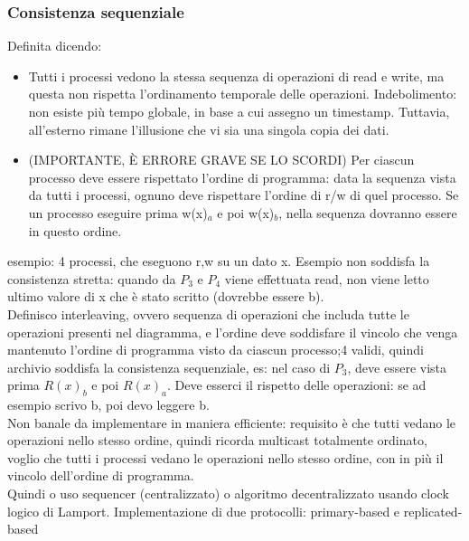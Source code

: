\documentclass{article}
\begin{document}
\subsubsection{Consistenza sequenziale}
Definita dicendo:
\begin{itemize}
\item Tutti i processi vedono la stessa sequenza di operazioni di read e write, ma questa non rispetta l'ordinamento temporale delle operazioni. Indebolimento: non esiste più tempo globale, in base a cui assegno un timestamp. Tuttavia, all'esterno rimane l'illusione che vi sia una singola copia dei dati.
\item (IMPORTANTE, È ERRORE GRAVE SE LO SCORDI) Per ciascun processo deve essere rispettato l'ordine di programma: data la sequenza vista da tutti i processi, ognuno deve rispettare l'ordine di r/w di quel processo. Se un processo eseguire prima w(x)$_a$ e poi w(x)$_b$, nella sequenza dovranno essere in questo ordine.
\end{itemize}
esempio: 4 processi, che eseguono r,w su un dato x. Esempio non soddisfa la consistenza stretta: quando da $P_3$ e $P_4$ viene effettuata read, non viene letto ultimo valore di x che è stato scritto (dovrebbe essere b).\\ Definisco interleaving, ovvero sequenza di operazioni che includa tutte le operazioni presenti nel diagramma, e l'ordine deve soddisfare il vincolo che venga mantenuto l'ordine di programma visto da ciascun processo;4 validi, quindi archivio soddisfa la consistenza sequenziale, es: nel caso di $P_3$, deve essere vista prima $R(x)_b$ e poi $R(x)_a$. Deve esserci il rispetto delle operazioni: se ad esempio scrivo b, poi devo leggere b.\\ Non banale da implementare in maniera efficiente: requisito è che tutti vedano le operazioni nello stesso ordine, quindi ricorda multicast totalmente ordinato, voglio che tutti i processi vedano le operazioni nello stesso ordine, con in più il vincolo dell'ordine di programma.\\ Quindi o uso sequencer (centralizzato) o algoritmo decentralizzato usando clock logico di Lamport. Implementazione di due protocolli: primary-based e replicated-based 
\end{document}
